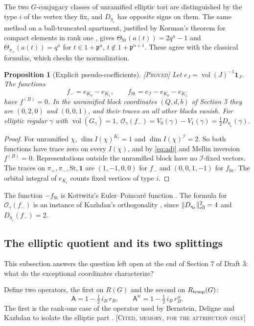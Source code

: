 \documentclass[12pt,letterpaper]{amsart}
\numberwithin{equation}{section}
\newtheorem{proposition}[theorem]{Proposition}
\theoremstyle{definition}
\theoremstyle{remark}
\newcommand{\St}{\mathrm{St}}
\newcommand{\triv}{\mathbf 1}
\newcommand{\vol}{\operatorname{vol}}
\newcommand{\status}[1]{\textup{[\textsc{#1}]}}
\begin{document}
The two $G$-conjugacy classes of unramified elliptic tori are distinguished by the type $i$ of the vertex they fix, and $D_{\eta_\varepsilon}$ has opposite signs on them. The same method on a ball-truncated apartment, justified by Korman's theorem for compact elements in rank one \cite{Ko04}, gives $\Theta_{\St}(a(t))=2q^n-1$ and $\Theta_{\pi_\pm}(a(t))=q^n$ for $t\in1+\mathfrak p^n$, $t\notin 1+\mathfrak p^{n+1}$. These agree with the classical formulas, which checks the normalization.

\begin{proposition}[Explicit pseudo-coefficients]\label{prop:pseudo}\status{Proved}
Let $e_J=\vol(J)^{-1}\mathbf 1_J$. The functions
\[
f_-=e_{K_0}-e_{K_1},\qquad f_{\St}=e_{\mathcal I}-e_{K_0}-e_{K_1}
\]
have $f^{(B)}=0$. In the unramified block coordinates $(Q,d,b)$ of Section 5 they are $(0,2,0)$ and $(0,0,1)$, and their traces on all other blocks vanish. For elliptic regular $\gamma$ with $\vol(G_\gamma)=1$, $\mathcal O_\gamma(f_-)=V_0(\gamma)-V_1(\gamma)=\tfrac12D_{\eta_\varepsilon}(\gamma)$.
\end{proposition}
\begin{proof}
For unramified $\chi$, $\dim I(\chi)^{K_i}=1$ and $\dim I(\chi)^{\mathcal I}=2$. So both functions have trace zero on every $I(\chi)$, and by \eqref{eq:adj} and Mellin inversion $f^{(B)}=0$. Representations outside the unramified block have no $\mathcal I$-fixed vectors. The traces on $\pi_+,\pi_-,\St,\triv$ are $(1,-1,0,0)$ for $f_-$ and $(0,0,1,-1)$ for $f_{\St}$. The orbital integral of $e_{K_i}$ counts fixed vertices of type $i$.
\end{proof}
The function $-f_{\St}$ is Kottwitz's Euler--Poincar\'e function \cite{Ko88}. The formula for $\mathcal O_\gamma(f_-)$ is an instance of Kazhdan's orthogonality \cite{Ka86,SS97}, since $\|D_{\eta_\varepsilon}\|^2_{\rm ell}=4$ and $D_{\eta_\varepsilon}(f_-)=2$.

\subsection{The elliptic quotient and its two splittings}\label{sub:split}
This subsection answers the question left open at the end of Section 7 of Draft 3: what do the exceptional coordinates characterize?

Define two operators, the first on $R(G)$ and the second on $R_{\rm temp}(G)$:
\[
\mathsf A=1-\tfrac12\,i_B\,r_B,\qquad \mathsf A^w=1-\tfrac12\,i_B\,r_B^w .
\]
The first is the rank-one case of the operator used by Bernstein, Deligne and Kazhdan to isolate the elliptic part \cite{BDK86,Da00}. \status{Cited, memory, for the attribution only}
\end{document}
